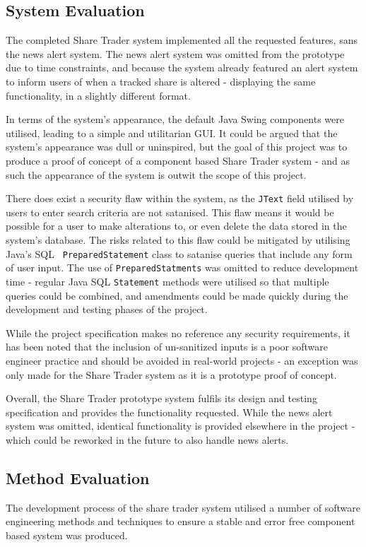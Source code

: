 \documentclass[12pt, a4paper,titlepage]{article}
\begin{document}
\subsection{System Evaluation}
The completed Share Trader system implemented all the requested features, sans
the news alert system. 
The news alert system was omitted from the prototype due to time constraints,
and because the system already featured an alert system to inform users of
when a tracked share is altered - displaying the same functionality, in a
slightly different format.

In terms of the system’s appearance, the default Java Swing components were
utilised, leading to a simple and utilitarian GUI. 
It could be argued that the system's appearance was dull or uninspired, but
the goal of this project was to produce a proof of concept of a component
based Share Trader system - and as such the appearance of the system is outwit
the scope of this project.

There does exist a security flaw within the system, as the {\tt JText} field
utilised by users to enter search criteria are not satanised. 
This flaw means it would be possible for a user to make alterations to, or
even delete the data stored in the system’s database. 
The risks related to this flaw could be mitigated by utilising Java's SQL {\tt
PreparedStatement} class to satanise queries that include any form of user
input.
The use of {\tt PreparedStatments} was omitted to reduce development time -
regular Java SQL {\tt Statement} methods  were utilised so that multiple
queries could be combined, and amendments could be made quickly during the
development and testing phases of the project.  

While the project specification makes no reference any security requirements,
it has been noted that the inclusion of un-sanitized inputs is a poor software
engineer practice and should be avoided in real-world projects - an exception
was only made for the Share Trader system as it is a prototype proof of
concept.

Overall, the Share Trader prototype system fulfils its design and testing
specification and provides the functionality requested. 
While the news alert system was omitted, identical functionality is provided
elsewhere in the project - which could be reworked in the future to also
handle news alerts.

\subsection{Method Evaluation}
The development process of the share trader system utilised a number of
software engineering methods and techniques to ensure a stable and error free
component based system was produced.  
\end{document}

